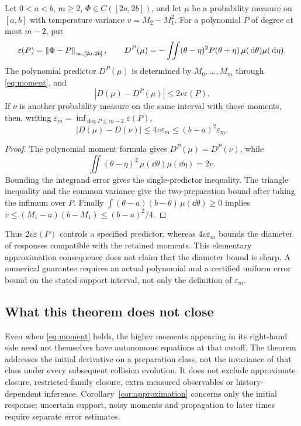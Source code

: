 \documentclass[11pt]{article}
\begin{document}
\begin{corollary}\label{cor:approximation}
Let $0<a<b$, $m\geq2$, $\Phi\in C([2a,2b])$, and let $\mu$ be a probability measure on $[a,b]$
with temperature variance $v=M_2-M_1^2$. For a polynomial $P$ of degree
at most $m-2$, put
\[
 \varepsilon(P)=\left\lVert \Phi-P\right\rVert_{\infty,[2a,2b]},\qquad
 D^P(\mu)=-\iint(\theta-\eta)^2P(\theta+\eta)
                         \,\mu(\,\mathrm d\theta)\mu(\,\mathrm d\eta).
\]
The polynomial predictor $D^P(\mu)$ is determined by $M_0,\ldots,M_m$
through \eqref{eq:moment}, and
\[
 |D(\mu)-D^P(\mu)|\leq2v\varepsilon(P).
\]
If $\nu$ is another probability measure on the same interval with those
moments, then, writing
$\varepsilon_m=\inf_{\deg P\leq m-2}\varepsilon(P)$,
\[
 |D(\mu)-D(\nu)|\leq4v\varepsilon_m
                   \leq(b-a)^2\varepsilon_m.
\]
\end{corollary}
\begin{proof}
The polynomial moment formula gives $D^P(\mu)=D^P(\nu)$, while
\[
 \iint(\theta-\eta)^2\,\mu(\dd\theta)\mu(\dd\eta)=2v.
\]
Bounding the integrand error gives the single-predictor inequality.
The triangle inequality and the common variance give the two-preparation
bound after taking the infimum over $P$. Finally
$\int(\theta-a)(b-\theta)\,\mu(\dd\theta)\geq0$ implies
$v\leq(M_1-a)(b-M_1)\leq(b-a)^2/4$.
\end{proof}
Thus $2v\varepsilon(P)$ controls a specified predictor, whereas
$4v\varepsilon_m$ bounds the diameter of responses compatible with the
retained moments. This elementary approximation consequence does not
claim that the diameter bound is sharp. A numerical guarantee requires
an actual polynomial and a certified uniform error bound on the stated
support interval, not only the definition of $\varepsilon_m$.

\subsection{What this theorem does not close}
Even when \eqref{eq:moment} holds, the higher moments appearing in its
right-hand side need not themselves have autonomous equations at that cutoff.
The theorem addresses the initial derivative on a preparation class, not the
invariance of that class under every subsequent collision evolution.
It does not exclude approximate closure, restricted-family closure,
extra measured observables or history-dependent inference.
Corollary~\ref{cor:approximation} concerns only the initial response;
uncertain support, noisy moments and propagation to later times require
separate error estimates.
\end{document}
